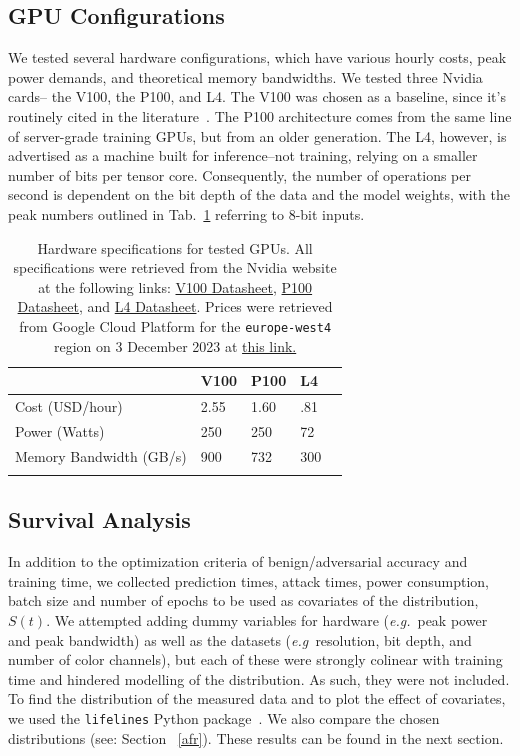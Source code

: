 \documentclass[conference]{IEEEtran}
\begin{document}
\subsection{GPU Configurations}
We tested several hardware configurations, which have various hourly costs, peak power demands, and theoretical memory bandwidths. We tested three Nvidia cards-- the V100, the P100, and L4. The V100 was chosen as a baseline, since it's routinely cited in the literature~\cite{svedin2021benchmarking,xu2018deep}. The P100 architecture comes from the same line of server-grade training GPUs, but from an older generation. The L4, however, is advertised as a machine built for inference--not training, relying on a smaller number of bits per tensor core. Consequently, the number of operations per second is dependent on the bit depth of the data and the model weights, with the peak numbers outlined in Tab.~\ref{tab:hardware} referring to 8-bit inputs.
\begin{table}[h]
\begin{tabular}{lllll}
\hline
                        & V100   & P100   & L4    &  \\ \hline
Cost (USD/hour)         & 2.55   & 1.60   & .81   &  \\
Power (Watts)           & 250    & 250    & 72    &  \\
Memory Bandwidth (GB/s) & 900    & 732    & 300   &  \\ \hline
\label{tab:hardware}
\end{tabular}
\caption{Hardware specifications for tested GPUs. All specifications were retrieved from the Nvidia website at the following links: 
\href{https://images.nvidia.com/content/technologies/volta/pdf/volta-v100-datasheet-update-us-1165301-r5.pdf}{V100 Datasheet},
\href{https://images.nvidia.com/content/tesla/pdf/nvidia-tesla-p100-PCIe-datasheet.pdf}{P100 Datasheet}, and
\href{https://nvdam.widen.net/s/rvq98gbwsw/l4-datasheet-2595652}{L4 Datasheet}. Prices were retrieved from Google Cloud Platform for the \texttt{europe-west4} region on 3 December 2023 at \href{https://cloud.google.com/pricing/list}{this link.}
}
\end{table}

\subsection{Survival Analysis}
In addition to the optimization criteria of benign/adversarial accuracy and training time, we collected prediction times, attack times, power consumption, batch size and number of epochs to be used as covariates of the distribution, $S(t)$. We attempted adding dummy variables for hardware (\textit{e.g.}~peak power and peak bandwidth) as well as the datasets (\textit{e.g~}resolution, bit depth, and number of color channels), but each of these were strongly colinear with training time and hindered modelling of the distribution. As such, they were not included. To find the distribution of the measured data and to plot the effect of covariates, we used the \texttt{lifelines} Python package~\cite{lifelines}. We also compare the chosen distributions (see: Section ~\ref{afr}).  These results can be found in the next section.
\end{document}
